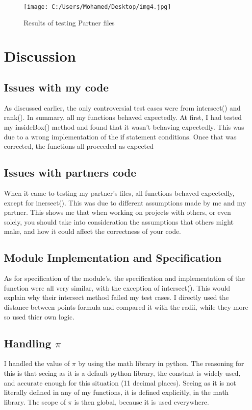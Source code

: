 \documentclass[12pt]{article}
\begin{document}
\begin{figure}
\centering
\texttt{[image: C:/Users/Mohamed/Desktop/img4.jpg]}
\caption{Results of testing Partner files}
\label{Figure : example}
\end{figure}

\newpage
\section*{Discussion}
\subsection{Issues with my code}
As discussed earlier, the only controversial test cases were from intersect() and rank(). In summary, all my functions 
behaved expectedly. At first, I had tested my insideBox() method and found that it wasn't behaving expectedly. This 
was due to a wrong implementation of the if statement conditions. Once that was corrected, the functions all proceeded
as expected


\subsection{Issues with partners code}
When it came to testing my partner's files, all functions behaved expectedly, except for inersect(). This was due to 
different assumptions made by me and my partner. This shows me that when working on projects with others, or even
solely, you should take into consideration the assumptions that others might make, and how it could affect the correctness
of your code.


\subsection{Module Implementation and Specification}
As for specification of the module's, the specification and implementation of the function were all very similar, with the exception 
of intersect(). This would explain why their intersect method failed my test cases. I directly used the distance between points  formula and compared it with the radii, while they more so used thier own logic.


\subsection{Handling  $\pi$}
I handled the value of  $\pi$ by using the math library in python. The reasoning for this is that seeing as it is a default python
library, the constant is widely used, and accurate enough for this situation (11 decimal places). Seeing as it is not literally defined in any of my functions, 
it is defined explicitly, in the math library. The scope of  $\pi$ is then global, because it is used everywhere. 
\newpage
\end{document}
